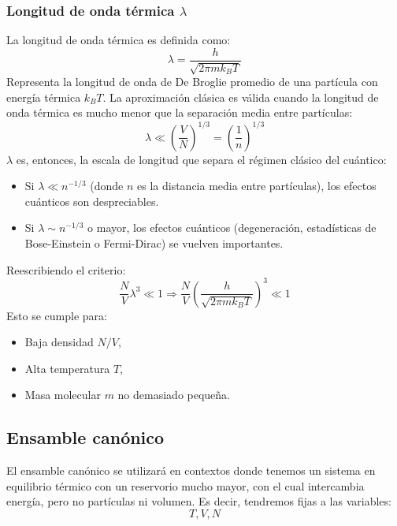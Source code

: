 \documentclass[]{article}
\numberwithin{equation}{section}
\newcommand{\0}{\textcolor{gray}{0}}
\begin{document}
\subsubsection{Longitud de onda térmica \(\lambda\)}
La longitud de onda térmica es definida como:
\begin{equation}
	\lambda = \dfrac{h}{\sqrt{2\pi m k_B T}}\label{lambda_onda_termica}
\end{equation}
Representa la longitud de onda de De Broglie promedio de una partícula con energía térmica \(k_B T\). La aproximación clásica es válida cuando la longitud de onda térmica es mucho menor que la separación media entre partículas:
\begin{equation}
	\lambda \ll \left(\frac{V}{N} \right) ^{1/3} = \left(\frac{1}{n} \right) ^{1/3} 
\end{equation}
\(\lambda\) es, entonces, la escala de longitud que separa el régimen clásico del cuántico:
\begin{itemize}
	\item Si \(\lambda \ll n^{-1/3}\) (donde \(n\) es la distancia media entre partículas), los efectos cuánticos son despreciables.
	\item Si \(\lambda \sim n^{-1/3}\) o mayor, los efectos cuánticos (degeneración, estadísticas de Bose-Einstein o	Fermi-Dirac) se vuelven importantes.
\end{itemize}
Reescribiendo el criterio:
\begin{equation}
	\frac{N}{V}\lambda^3 \ll 1 \Rightarrow \frac{N}{V}\left(\frac{h}{\sqrt{2\pi mk_BT}}\right)^3 \ll 1
\end{equation}
Esto se cumple para:
\begin{itemize}
	\item Baja densidad \(N/V\),
	\item Alta temperatura \(T\),
	\item Masa molecular \(m\) no demasiado pequeña.
\end{itemize}

\subsection{Ensamble canónico}
El ensamble canónico se utilizará en contextos donde tenemos un sistema en equilibrio térmico con un reservorio mucho mayor, con el cual intercambia energía, pero no partículas ni volumen. Es decir, tendremos fijas a las variables:
\begin{equation*}
	T, V, N
\end{equation*}
\end{document}
